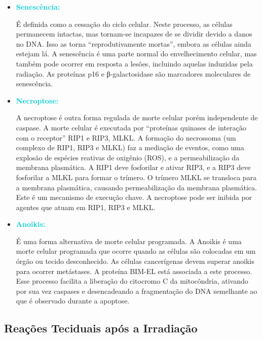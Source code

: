 \documentclass[11pt,a4paper]{article}
\begin{document}
\begin{itemize}[label=\textcolor{CarnationPink}{$\blacktriangleright$}]
		\item \textcolor{DarkTurquoise}{\LobsterTwo\Large\textbf{Senescência:}}
		
		É definida como a cessação do ciclo celular. Neste processo, as células permanecem intactas, mas tornam-se incapazes de se dividir devido a danos no DNA. Isso as torna “reprodutivamente mortas”, embora as células ainda estejam lá. A senescência é uma parte normal do envelhecimento celular, mas também pode ocorrer em resposta a lesões, incluindo aquelas induzidas pela radiação. As proteínas p16 e β-galactosidase são marcadores moleculares de senescência.

		\item \textcolor{DarkTurquoise}{\LobsterTwo\Large\textbf{Necroptose:}}
		
		A necroptose é outra forma regulada de morte celular porém independente de caspase. A morte celular é executada por “proteínas quinases de interação com o receptor” RIP1 e RIP3, MLKL. A formação do necrossoma (um complexo de RIP1, RIP3 e MLKL) faz a mediação de eventos, como uma explosão de espécies reativas de oxigênio (ROS), e a permeabilização da membrana plasmática. A RIP1 deve fosforilar e ativar RIP3, e a RIP3 deve fosforilar a MLKL para formar o trímero. O trímero MLKL se transloca para a membrana plasmática, causando permeabilização da membrana plasmática. Este é um mecanismo de execução chave. A necroptose pode ser inibida por agentes que atuam em RIP1, RIP3 e MLKL.

		\item \textcolor{DarkTurquoise}{\LobsterTwo\Large\textbf{Anoikis:}}
		
		É uma forma alternativa de morte celular programada. A Anoikis é uma morte celular programada que ocorre quando as células são colocadas em um órgão ou tecido desconhecido. As células cancerígenas devem superar anoikis para ocorrer metástases. A proteína BIM-EL está associada a este processo. Esse processo facilita a liberação do citocromo C da mitocôndria, ativando por sua vez caspases e desencadeando a fragmentação do DNA semelhante ao que é observado durante a apoptose.
	\end{itemize}


\subsection{Reações Teciduais após a Irradiação}
\end{document}
